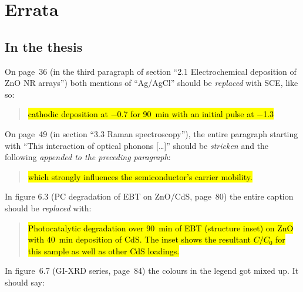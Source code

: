 \documentclass[webedition,titles,swedish,english]{LuaUUThesis}\usepackage[]{graphicx}\usepackage[]{xcolor}
\begin{document}


\mainmatter

\setlength{\parindent}{0pt}
\setlength{\parskip}{2ex plus 1.0ex minus 0.4ex}


\chapter*{Errata}


\section*{In the thesis}

On page~36 (in the third paragraph of section \enquote{2.1 Electrochemical deposition of ZnO NR arrays})
both mentions of \enquote{Ag/AgCl} should be \emph{replaced} with SCE, like so:
\blockquote{\hl{%
   cathodic deposition at \mbox{\qty{-0.7}{\voltSCE}} for \mbox{\qty{90}{\minute}} with an
   initial pulse at \mbox{\qty{-1.3}{\voltSCE}}}}.

On page~49 (in section \enquote{3.3 Raman spectroscopy}), the entire paragraph
starting with \enquote{This interaction of optical phonons [\ldots]} should
be \emph{stricken} and the following \emph{appended to the preceding paragraph}:
\blockquote{\hl{%
   which strongly influences the semiconductor's carrier mobility.
}}

In figure 6.3 (PC degradation of EBT on ZnO/CdS, page~80) the entire caption
should be \emph{replaced} with:
\blockquote{\hl{%
   Photocatalytic degradation over \mbox{\qty{90}{\minute}} of EBT (structure inset)
   on ZnO with \mbox{\qty{40}{\minute}} deposition of CdS.
   The inset shows the resultant $C/C_0$ for this sample as well as other CdS loadings.}}

In figure~6.7 (GI-XRD series, page~84) the colours in the legend got mixed up.
It should say:
\end{document}
